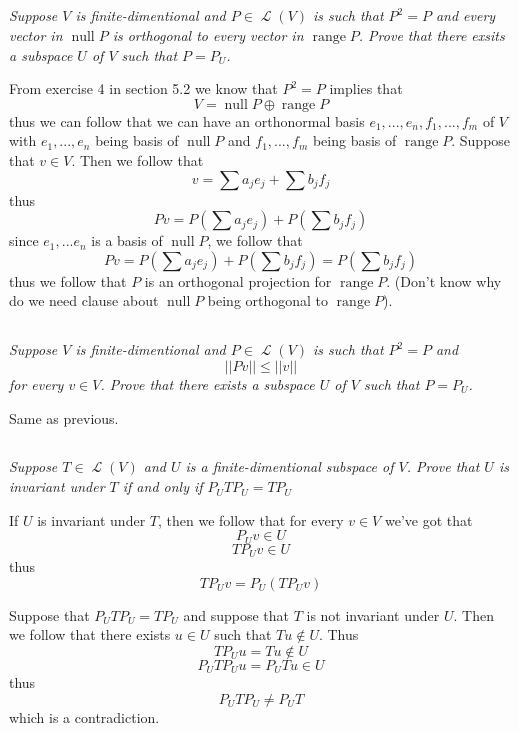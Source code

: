 \documentclass[11pt,oneside,titlepage]{book}
\DeclareMathOperator \map {\mathcal {L}}
\DeclareMathOperator \ns {null}
\DeclareMathOperator \range {range}
\begin{document}
\subsection{}

\textit{Suppose $V$ is finite-dimentional and $P \in \map(V)$ is such that $P^2 = P$ and
  every vector in $\ns P$ is orthogonal to every vector in $\range P$. Prove that there
  exsits a subspace $U$ of $V$ such that $P = P_U$.}

From exercise 4 in section 5.2 we know that $P^2 = P$ implies that
$$V = \ns P \oplus \range P$$
thus we can follow that we can have an orthonormal basis $e_1, ..., e_n, f_1, ..., f_m$ of $V$
with $e_1, ..., e_n$ being basis of $\ns P$ and $f_1, ..., f_m$ being basis of $\range P$.
Suppose that $v \in V$. Then we follow that
$$v = \sum{a_j e_j} + \sum{b_j f_j}$$
thus
$$P v = P (\sum{a_j e_j}) + P(\sum{b_j f_j})$$
since $e_1, ... e_n$ is a basis of $\ns P$, we follow that
$$P v = P (\sum{a_j e_j}) + P(\sum{b_j f_j}) = P(\sum{b_j f_j})$$
thus we follow that $P$ is an orthogonal projection for $\range P$. (Don't know why do we need
clause about $\ns P$ being orthogonal to $\range P$).

\subsection{}

\textit{Suppose $V$ is finite-dimentional and $P \in \map(V)$ is such that $P^2 = P$ and
  $$||Pv|| \leq ||v||$$
  for every $v \in V$. Prove that there exists a subspace $U$ of $V$ such that $P = P_U$.}

Same as previous.

\subsection{}

\textit{Suppose $T \in \map(V)$ and $U$ is a finite-dimentional subspace of $V$. Prove that
  $U$ is invariant under $T$ if and only if $P_U T P_U = T P_U$}

If $U$ is invariant under $T$, then we follow that for every $v \in V$ we've got that
$$P_U v \in U$$
$$T P_U v \in U$$
thus
$$T P_U v = P_U(T P_U v)$$


Suppose that $P_U T P_U = T P_U$ and suppose that $T$ is not invariant under $U$. Then we follow
that there exists $u \in U$ such that $Tu \notin U$. Thus
$$T P_U u = T u \notin U$$
$$P_U T P_U u = P_U T u \in U$$
thus
$$P_U T P_U \neq P_U T$$
which is a contradiction.
\end{document}

